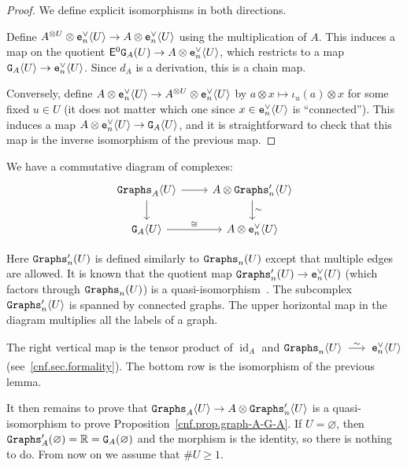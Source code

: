 \begin{proof}
  We define explicit isomorphisms in both directions.

  Define $A^{\otimes U} \otimes \mathtt{e}_{n}^{\vee} \langle U \rangle \to A \otimes \mathtt{e}_{n}^{\vee} \langle U \rangle$ using the multiplication of $A$.
  This induces a map on the quotient $\mathsf{E}^{0} \mathtt{G}_{A}(U) \to A \otimes \mathtt{e}_{n}^{\vee} \langle U \rangle$, which restricts to a map $\mathtt{G}_{A} \langle U \rangle \to \mathtt{e}_{n}^{\vee} \langle U \rangle$.
  Since $d_{A}$ is a derivation, this is a chain map.

  Conversely, define $A \otimes \mathtt{e}_{n}^{\vee} \langle U \rangle \to A^{\otimes U} \otimes \mathtt{e}_{n}^{\vee} \langle U \rangle$ by $a \otimes x \mapsto \iota_{u}(a) \otimes x$ for some fixed $u \in U$ (it does not matter which one since $x \in \mathtt{e}_{n}^{\vee} \langle U \rangle$ is ``connected'').
  This induces a map $A \otimes \mathtt{e}_{n}^{\vee} \langle U \rangle \to \mathtt{G}_{A} \langle U \rangle$, and it is straightforward to check that this map is the inverse isomorphism of the previous map.
\end{proof}

We have a commutative diagram of complexes:
\[ \begin{tikzcd}
    \Graphs_{A} \langle U \rangle \rar \dar & A \otimes \Graphs'_{n} \langle U \rangle \dar{\sim} \\
    \GG{A} \langle U \rangle \rar{\cong} & A \otimes \enV \langle U \rangle
  \end{tikzcd} \]

Here $\mathtt{Graphs}'_{n}(U)$ is defined similarly to $\mathtt{Graphs}_{n}(U)$ except that multiple edges are allowed.
It is known that the quotient map $\mathtt{Graphs}'_{n}(U) \to \mathtt{e}_{n}^{\vee}(U)$ (which factors through $\mathtt{Graphs}_{n}(U)$) is a quasi-isomorphism~\cite[Proposition 3.9]{Willwacher2014}.
The subcomplex $\mathtt{Graphs}'_{n} \langle U \rangle$ is spanned by connected graphs.
The upper horizontal map in the diagram multiplies all the labels of a graph.

The right vertical map is the tensor product of $\operatorname{id}_{A}$ and $\Graphs_{n} \langle U \rangle \qiso \enV \langle U \rangle$ (see~\ref{cnf.sec.formality}).
The bottom row is the isomorphism of the previous lemma.

It then remains to prove that $\mathtt{Graphs}_{A} \langle U \rangle \to A \otimes \mathtt{Graphs}'_{n} \langle U \rangle$ is a quasi-iso\-mor\-phism to prove Proposition~\ref{cnf.prop.graph-A-G-A}.
If $U = \varnothing$, then $\mathtt{Graphs}'_{A}(\varnothing) = \mathbb{R} = \mathtt{G}_{A}(\varnothing)$ and the morphism is the identity, so there is nothing to do.
From now on we assume that $\# U \geq 1$.

